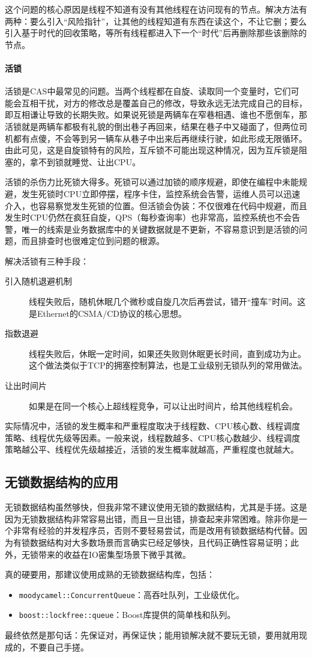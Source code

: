这个问题的核心原因是线程不知道有没有其他线程在访问现有的节点。解决方法有两种：要么引入“风险指针”，让其他的线程知道有东西在读这个，不让它删；要么引入基于时代的回收策略，等所有线程都进入下一个“时代”后再删除那些该删除的节点。

\paragraph{活锁} 活锁是CAS中最常见的问题。当两个线程都在自旋、读取同一个变量时，它们可能会互相干扰，对方的修改总是覆盖自己的修改，导致永远无法完成自己的目标，即互相谦让导致的长期失败。如果说死锁是两辆车在窄巷相遇、谁也不愿倒车，那活锁就是两辆车都极有礼貌的倒出巷子再回来，结果在巷子中又碰面了，但两位司机都有点傻，不会等到另一辆车从巷子中出来后再继续行驶，如此形成无限循环。由此可见，这是自旋锁特有的风险，互斥锁不可能出现这种情况，因为互斥锁是阻塞的，拿不到锁就睡觉、让出CPU。

活锁的杀伤力比死锁大得多。死锁可以通过加锁的顺序规避，即使在编程中未能规避，发生死锁时CPU立即停摆，程序卡住，监控系统会告警，运维人员可以迅速介入，也容易察觉发生死锁的位置。但活锁会伪装：不仅很难在代码中规避，而且发生时CPU仍然在疯狂自旋，QPS（每秒查询率）也非常高，监控系统也不会告警，唯一的线索是业务数据库中的关键数据就是不更新，不容易意识到是活锁的问题，而且排查时也很难定位到问题的根源。

解决活锁有三种手段：
\begin{description}
    \item[引入随机退避机制] 线程失败后，随机休眠几个微秒或自旋几次后再尝试，错开“撞车”时间。这是Ethernet的CSMA/CD协议的核心思想。
    \item[指数退避] 线程失败后，休眠一定时间，如果还失败则休眠更长时间，直到成功为止。这个做法类似于TCP的拥塞控制算法，也是工业级别无锁队列的常用做法。
    \item[让出时间片] 如果是在同一个核心上超线程竞争，可以让出时间片，给其他线程机会。
\end{description}

实际情况中，活锁的发生概率和严重程度取决于线程数、CPU核心数、线程调度策略、线程优先级等因素。一般来说，线程数越多、CPU核心数越少、线程调度策略越公平、线程优先级越接近，活锁的发生概率就越高，严重程度也就越大。

\subsection{无锁数据结构的应用}

无锁数据结构虽然够快，但我非常不建议使用无锁的数据结构，尤其是手搓。这是因为无锁数据结构非常容易出错，而且一旦出错，排查起来非常困难。除非你是一个非常有经验的并发程序员，否则不要轻易尝试，而是改用有锁数据结构代替。因为有锁数据结构对大多数场景而言确实已经足够快，且代码正确性容易证明；此外，无锁带来的收益在IO密集型场景下微乎其微。

真的硬要用，那建议使用成熟的无锁数据结构库，包括：
\begin{itemize}
    \item \verb|moodycamel::ConcurrentQueue|：高吞吐队列，工业级优化。
    \item \verb|boost::lockfree::queue|：Boost库提供的简单栈和队列。
\end{itemize}
最终依然是那句话：先保证对，再保证快；能用锁解决就不要玩无锁，要用就用现成的，不要自己手搓。